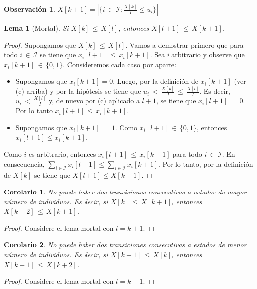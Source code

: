 \documentclass{article}
\newtheorem{coro}{Corolario}
\newtheorem{lema}{Lema}
\newtheorem{obs}{Observación}
\begin{document}
\begin{obs}
$X[k{+}1]=|\{i\,{\in}\,\mathcal{I}:\frac{X[k]}{I}\leq u_i\}|$
\end{obs}

\begin{lema}[Mortal]
Si $X[k]\,{\leq}\,X[l]$, entonces $X[l{+}1]\,{\leq}\,X[k{+}1]$.
\end{lema}

\begin{proof}
Supongamos que $X[k]\,{\leq}\,X[l]$. Vamos a demostrar primero que para todo $i\,{\in}\,\mathcal{I}$ se tiene que $x_i[l{+}1]\,{\leq}\, x_i[k{+}1]$. Sea $i$ arbitrario y observe que $x_i[k{+}1]\,{\in}\,\{0, 1\}$. Consideremos cada caso por aparte:
%
\begin{itemize}
\item Supongamos que $x_i[k{+}1]=0$. Luego, por la definición de $x_i[k{+}1]$ (ver (c) arriba) y por la hipótesis se tiene que $u_i\,{<}\,\frac{X[k]}{I}\,{\leq}\,\frac{X[l]}{I}$. Es decir, $u_i\,{<}\,\frac{X[l]}{I}$ y, de nuevo por (c) aplicado a $l{+}1$, se tiene que $x_i[l{+}1]\,{=}\,0$. Por lo tanto $x_i[l{+}1]\,{\leq}\,x_i[k{+}1]$.
\item Supongamos que $x_i[k{+}1]\,{=}\,1$. Como $x_i[l{+}1]\,{\in}\,\{0,1\}$, entonces $x_i[l{+}1]\leq x_i[k{+}1]$.
\end{itemize}
%
Como $i$ es arbitrario, entonces $x_i[l{+}1]\,{\leq}\, x_i[k{+}1]$ para todo $i\,{\in}\,\mathcal{I}$. En consecuencia, $\sum_{i\in\mathcal{I}} x_i[l{+}1]\leq \sum_{i\in\mathcal{I}} x_i[k{+}1]$. Por lo tanto, por la definición de $X[k]$ se tiene que $X[l{+}1]\leq X[k{+}1]$.
\end{proof}

\begin{coro}\label{lema1}
No puede haber dos transiciones consecutivas a estados de mayor número de individuos. Es decir, si $X[k]\,{\leq}\,X[k{+}1]$, entonces $X[k{+}2]\,{\leq}\, X[k{+}1]$.
\end{coro}
\begin{proof}
Considere el lema mortal con $l=k+1$.
\end{proof}

\begin{coro}\label{lema2}
No puede haber dos transiciones consecutivas a estados de menor número de individuos. Es decir, si $X[k{+}1]\,{\leq}\,X[k]$, entonces $X[k{+}1]\,{\leq}\, X[k{+}2]$.
\end{coro}
\begin{proof}
Considere el lema mortal con $l=k-1$.
\end{proof}
\end{document}
